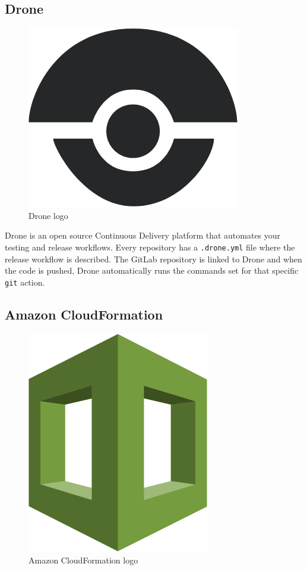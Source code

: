 \subsection*{Drone}

\begin{figure}[H]
\centering
\includegraphics[scale=0.1]{resources/drone-logo.png}
\caption{Drone logo}
\end{figure}

Drone\cite{drone} is an open source Continuous Delivery platform that automates your testing and release workflows. Every repository has a \texttt{.drone.yml} file where the release workflow is described. The GitLab repository is linked to Drone and when the code is pushed, Drone automatically runs the commands set for that specific \texttt{git} action.

\subsection*{Amazon CloudFormation}

\begin{figure}[H]
\centering
\includegraphics[scale=0.1]{resources/cf-logo.png}
\caption{Amazon CloudFormation logo}
\end{figure}

